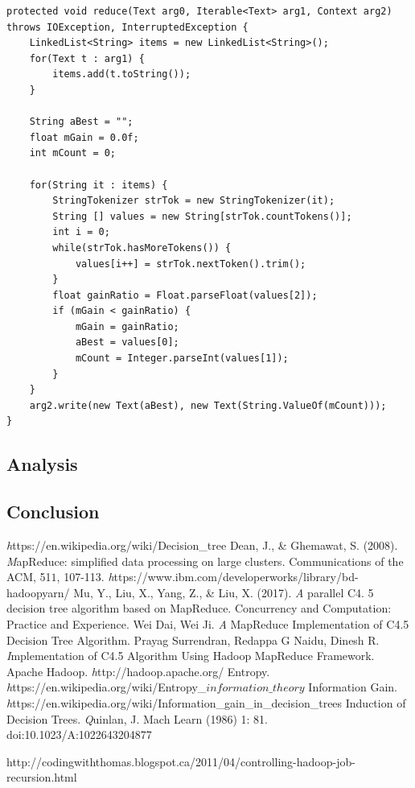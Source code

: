 \documentclass{article}
\begin{document}
\begin{lstlisting}[caption={Attrib Selection Reducer 2 code snippet},label={lst:attrselred},style=MyJavaStyle]
protected void reduce(Text arg0, Iterable<Text> arg1, Context arg2)
throws IOException, InterruptedException {
    LinkedList<String> items = new LinkedList<String>();
    for(Text t : arg1) {
        items.add(t.toString());
    }

    String aBest = "";
    float mGain = 0.0f;
    int mCount = 0;

    for(String it : items) {
        StringTokenizer strTok = new StringTokenizer(it);
        String [] values = new String[strTok.countTokens()];
        int i = 0;
        while(strTok.hasMoreTokens()) {
            values[i++] = strTok.nextToken().trim();
        }
        float gainRatio = Float.parseFloat(values[2]);
        if (mGain < gainRatio) {
            mGain = gainRatio;
            aBest = values[0];
            mCount = Integer.parseInt(values[1]);
        }
    }
    arg2.write(new Text(aBest), new Text(String.ValueOf(mCount)));
}
\end{lstlisting}

\subsection{Analysis}

\subsection{Conclusion}

\begin{thebibliography}{9}
\textit https://en.wikipedia.org/wiki/Decision\_tree
Dean, J., \& Ghemawat, S. (2008).
\textit MapReduce: simplified data processing on large clusters. Communications of the ACM, 51\(1\), 107-113.
\textit https://www.ibm.com/developerworks/library/bd-hadoopyarn/
Mu, Y., Liu, X., Yang, Z., \& Liu, X. (2017).
\textit A parallel C4. 5 decision tree algorithm based on MapReduce. Concurrency and Computation: Practice and Experience.
Wei Dai, Wei Ji.
\textit A MapReduce Implementation of C4.5 Decision Tree Algorithm.
Prayag Surrendran, Redappa G Naidu, Dinesh R.
\textit Implementation of C4.5 Algorithm Using Hadoop MapReduce Framework.
Apache Hadoop.
\textit http://hadoop.apache.org/
Entropy.
\textit https://en.wikipedia.org/wiki/Entropy\_\(information\_theory\)
Information Gain.
\textit https://en.wikipedia.org/wiki/Information\_gain\_in\_decision\_trees
Induction of Decision Trees.
\textit Quinlan, J. Mach Learn (1986) 1: 81. doi:10.1023/A:1022643204877
\end{thebibliography}
http://codingwiththomas.blogspot.ca/2011/04/controlling-hadoop-job-recursion.html
\end{document}
